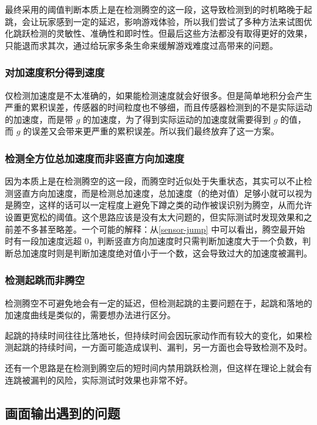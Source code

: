 \documentclass[UTF8, 11pt, fontset=none]{ctexart}
\begin{document}
最终采用的阈值判断本质上是在检测腾空的这一段，这导致检测到的时机略晚于起跳，会让玩家感到一定的延迟，影响游戏体验，所以我们尝试了多种方法来试图优化跳跃检测的灵敏性、准确性和即时性。但最后这些方法都没有取得更好的效果，只能退而求其次，通过给玩家多条生命来缓解游戏难度过高带来的问题。

\subsubsection{对加速度积分得到速度}

仅检测加速度是不太准确的，如果能检测速度就会好很多。但是简单地积分会产生严重的累积误差，传感器的时间粒度也不够细，而且传感器检测到的不是实际运动的加速度，而是带 $g$ 的加速度，为了得到实际运动的加速度就需要得到 $g$ 的值，而 $g$ 的误差又会带来更严重的累积误差。所以我们最终放弃了这一方案。

\subsubsection{检测全方位总加速度而非竖直方向加速度}

因为本质上是在检测腾空的这一段，而腾空时近似处于失重状态，其实可以不止检测竖直方向加速度，而是检测总加速度，总加速度（的绝对值）足够小就可以视为是腾空，这样的话可以一定程度上避免下蹲之类的动作被误识别为腾空，从而允许设置更宽松的阈值。这个思路应该是没有太大问题的，但实际测试时发现效果和之前差不多甚至略差。一个可能的解释：从\cref{sensor-jump} 中可以看出，腾空最开始时有一段加速度远超 $0$，判断竖直方向加速度时只需判断加速度大于一个负数，判断总加速度时则是判断加速度绝对值小于一个数，这会导致过大的加速度被漏判。

\subsubsection{检测起跳而非腾空}

检测腾空不可避免地会有一定的延迟，但检测起跳的主要问题在于，起跳和落地的加速度曲线是类似的，需要想办法进行区分。

起跳的持续时间往往比落地长，但持续时间会因玩家动作而有较大的变化，如果检测起跳的持续时间，一方面可能造成误判、漏判，另一方面也会导致检测不及时。

还有一个思路是在检测到腾空后的短时间内禁用跳跃检测，但这样在理论上就会有连跳被漏判的风险，实际测试时效果也非常不好。

\subsection{画面输出遇到的问题}
\end{document}
